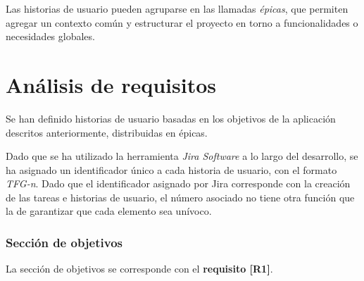 \documentclass[10pt, a4paper]{aqademic}
\begin{document}
Las historias de usuario pueden agruparse en las llamadas \textit{épicas}, que permiten agregar un contexto común y estructurar el proyecto en torno a funcionalidades o necesidades globales.


\section{Análisis de requisitos}

Se han definido historias de usuario basadas en los objetivos de la aplicación descritos anteriormente, distribuidas en épicas.

Dado que se ha utilizado la herramienta \textit{Jira Software} a lo largo del desarrollo, se ha asignado un identificador único a cada historia de usuario, con el formato \textit{TFG-n}. Dado que el identificador asignado por Jira corresponde con la creación de las tareas e historias de usuario, el número asociado no tiene otra función que la de garantizar que cada elemento sea unívoco.

\subsubsection*{Sección de objetivos}

La sección de objetivos se corresponde con el \textbf{requisito [R1]}.
\end{document}
